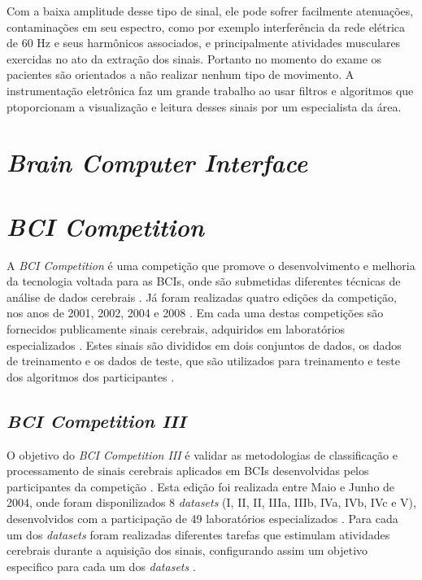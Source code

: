 Com a baixa amplitude desse tipo de sinal, ele pode sofrer facilmente
 atenuações, contaminações em seu espectro, como por exemplo interferência
 da rede elétrica de 60 Hz e seus harmônicos associados, e principalmente
 atividades musculares exercidas no ato da extração dos sinais. Portanto
 no momento do exame os pacientes são orientados a não realizar nenhum
 tipo de movimento. A instrumentação eletrônica faz um grande trabalho
 ao usar filtros e algoritmos que ptoporcionam a visualização e leitura
 desses sinais por um especialista da área.

\section{\textit{Brain Computer Interface}}

\section{\textit{BCI Competition}}
A \textit{BCI Competition} é uma competição que promove o desenvolvimento e melhoria da tecnologia voltada para as BCIs, onde são submetidas diferentes técnicas de análise de dados cerebrais \cite{BCICompetition}. Já foram realizadas quatro edições da competição, nos anos de 2001, 2002, 2004 e 2008 \cite{BCICompetition}. Em cada uma destas competições são fornecidos publicamente sinais cerebrais, adquiridos em laboratórios especializados \cite{BCICompetition}. Estes sinais são divididos em dois conjuntos de dados, os dados de treinamento e os dados de teste, que são utilizados para treinamento e teste dos algoritmos dos participantes \cite{BCICompetition}.

\subsection{\textit{BCI Competition III}}
O objetivo do \textit{BCI Competition III} é validar as metodologias de classificação e processamento de sinais cerebrais aplicados em BCIs desenvolvidas pelos participantes da competição \cite{siteBCI}. Esta edição foi realizada entre Maio e Junho de 2004, onde foram disponilizados 8 \textit{datasets} (I, II, II, IIIa, IIIb, IVa, IVb, IVc e V), desenvolvidos com a participação de 49 laboratórios especializados \cite{BCICompetition}.
Para cada um dos \textit{datasets} foram realizadas diferentes tarefas que estimulam atividades cerebrais durante a aquisição dos sinais, configurando assim um objetivo especifico para cada um dos \textit{datasets} \cite{siteBCI}.

